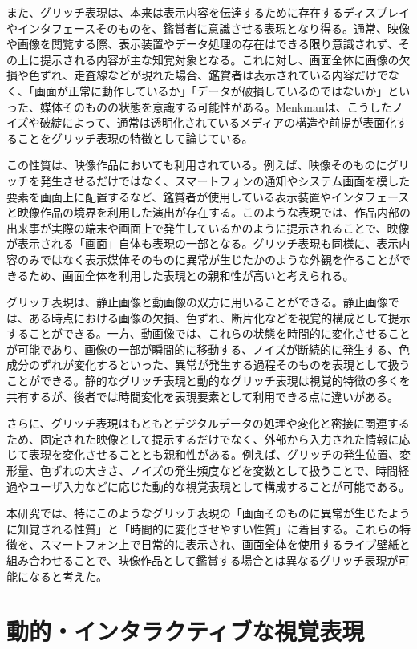 また、グリッチ表現は、本来は表示内容を伝達するために存在するディスプレイやインタフェースそのものを、鑑賞者に意識させる表現となり得る。通常、映像や画像を閲覧する際、表示装置やデータ処理の存在はできる限り意識されず、その上に提示される内容が主な知覚対象となる。これに対し、画面全体に画像の欠損や色ずれ、走査線などが現れた場合、鑑賞者は表示されている内容だけでなく、「画面が正常に動作しているか」「データが破損しているのではないか」といった、媒体そのものの状態を意識する可能性がある。Menkmanは、こうしたノイズや破綻によって、通常は透明化されているメディアの構造や前提が表面化することをグリッチ表現の特徴として論じている\cite{menkman2011}。

この性質は、映像作品においても利用されている。例えば、映像そのものにグリッチを発生させるだけではなく、スマートフォンの通知やシステム画面を模した要素を画面上に配置するなど、鑑賞者が使用している表示装置やインタフェースと映像作品の境界を利用した演出が存在する。このような表現では、作品内部の出来事が実際の端末や画面上で発生しているかのように提示されることで、映像が表示される「画面」自体も表現の一部となる。グリッチ表現も同様に、表示内容のみではなく表示媒体そのものに異常が生じたかのような外観を作ることができるため、画面全体を利用した表現との親和性が高いと考えられる。

グリッチ表現は、静止画像と動画像の双方に用いることができる。静止画像では、ある時点における画像の欠損、色ずれ、断片化などを視覚的構成として提示することができる。一方、動画像では、これらの状態を時間的に変化させることが可能であり、画像の一部が瞬間的に移動する、ノイズが断続的に発生する、色成分のずれが変化するといった、異常が発生する過程そのものを表現として扱うことができる。静的なグリッチ表現と動的なグリッチ表現は視覚的特徴の多くを共有するが、後者では時間変化を表現要素として利用できる点に違いがある。

さらに、グリッチ表現はもともとデジタルデータの処理や変化と密接に関連するため、固定された映像として提示するだけでなく、外部から入力された情報に応じて表現を変化させることとも親和性がある。例えば、グリッチの発生位置、変形量、色ずれの大きさ、ノイズの発生頻度などを変数として扱うことで、時間経過やユーザ入力などに応じた動的な視覚表現として構成することが可能である。

本研究では、特にこのようなグリッチ表現の「画面そのものに異常が生じたように知覚される性質」と「時間的に変化させやすい性質」に着目する。これらの特徴を、スマートフォン上で日常的に表示され、画面全体を使用するライブ壁紙と組み合わせることで、映像作品として鑑賞する場合とは異なるグリッチ表現が可能になると考えた。


\section{動的・インタラクティブな視覚表現}

